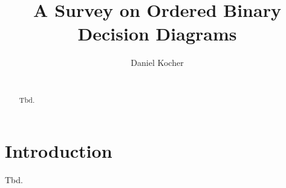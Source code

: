 \documentclass{vldb}
\begin{document}
\title{A Survey on Ordered Binary Decision Diagrams}


\author{
\alignauthor
	Daniel Kocher\\
    \\
}

\maketitle

\begin{abstract}
Tbd.
\end{abstract}

\section{Introduction}
Tbd.

\balance

%
%
\end{document}
